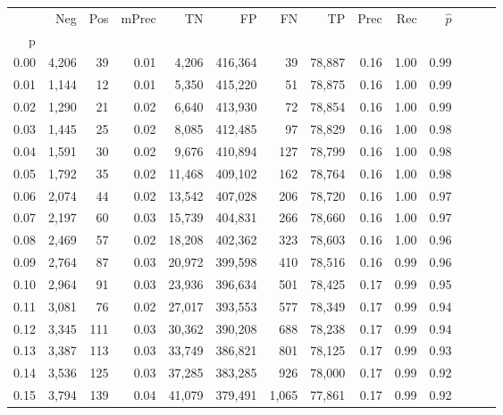 \begin{tabular}{rrrrrrrrrrrrrr}
\toprule
{} &    Neg &    Pos & mPrec &       TN &       FP &      FN &      TP &  Prec &   Rec & $\hat{p}$ \\
p    &        &        &       &          &          &         &         &       &       &           \\
\midrule
0.00 &  4,206 &     39 &  0.01 &    4,206 &  416,364 &      39 &  78,887 &  0.16 &  1.00 &      0.99 \\
0.01 &  1,144 &     12 &  0.01 &    5,350 &  415,220 &      51 &  78,875 &  0.16 &  1.00 &      0.99 \\
0.02 &  1,290 &     21 &  0.02 &    6,640 &  413,930 &      72 &  78,854 &  0.16 &  1.00 &      0.99 \\
0.03 &  1,445 &     25 &  0.02 &    8,085 &  412,485 &      97 &  78,829 &  0.16 &  1.00 &      0.98 \\
0.04 &  1,591 &     30 &  0.02 &    9,676 &  410,894 &     127 &  78,799 &  0.16 &  1.00 &      0.98 \\
0.05 &  1,792 &     35 &  0.02 &   11,468 &  409,102 &     162 &  78,764 &  0.16 &  1.00 &      0.98 \\
0.06 &  2,074 &     44 &  0.02 &   13,542 &  407,028 &     206 &  78,720 &  0.16 &  1.00 &      0.97 \\
0.07 &  2,197 &     60 &  0.03 &   15,739 &  404,831 &     266 &  78,660 &  0.16 &  1.00 &      0.97 \\
0.08 &  2,469 &     57 &  0.02 &   18,208 &  402,362 &     323 &  78,603 &  0.16 &  1.00 &      0.96 \\
0.09 &  2,764 &     87 &  0.03 &   20,972 &  399,598 &     410 &  78,516 &  0.16 &  0.99 &      0.96 \\
0.10 &  2,964 &     91 &  0.03 &   23,936 &  396,634 &     501 &  78,425 &  0.17 &  0.99 &      0.95 \\
0.11 &  3,081 &     76 &  0.02 &   27,017 &  393,553 &     577 &  78,349 &  0.17 &  0.99 &      0.94 \\
0.12 &  3,345 &    111 &  0.03 &   30,362 &  390,208 &     688 &  78,238 &  0.17 &  0.99 &      0.94 \\
0.13 &  3,387 &    113 &  0.03 &   33,749 &  386,821 &     801 &  78,125 &  0.17 &  0.99 &      0.93 \\
0.14 &  3,536 &    125 &  0.03 &   37,285 &  383,285 &     926 &  78,000 &  0.17 &  0.99 &      0.92 \\
0.15 &  3,794 &    139 &  0.04 &   41,079 &  379,491 &   1,065 &  77,861 &  0.17 &  0.99 &      0.92 \\

\end{tabular}
